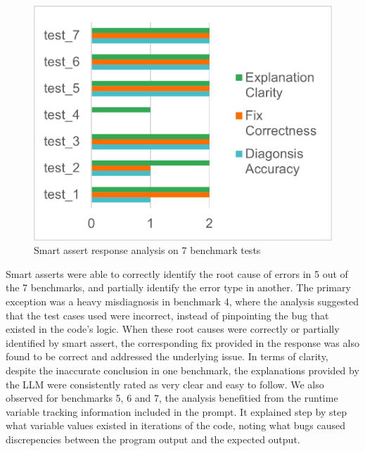\documentclass[sigconf]{acmart}
\begin{document}
\begin{figure}
    \centering
    \includegraphics[width=0.8\linewidth]{images/smartAssert.png}
    \caption{Smart assert response analysis on 7 benchmark tests}
    \label{fig:smartAssert}
\end{figure}

Smart asserts were able to correctly identify the root cause of errors in 5 out of the 7 benchmarks, and partially identify the error type in another. The primary exception was a heavy misdiagnosis in benchmark 4, where the analysis suggested that the test cases used were incorrect, instead of pinpointing the bug that existed in the code's logic.
When these root causes were correctly or partially identified by smart assert, the corresponding fix provided in the response was also found to be correct and addressed the underlying issue.
In terms of clarity, despite the inaccurate conclusion in one benchmark, the explanations provided by the LLM were consistently rated as very clear and easy to follow.
We also observed for benchmarks 5, 6 and 7, the analysis benefitied from the runtime variable tracking information included in the prompt. It explained step by step what variable values existed in iterations of the code, noting what bugs caused discrepencies between the program output and the expected output.
\end{document}
